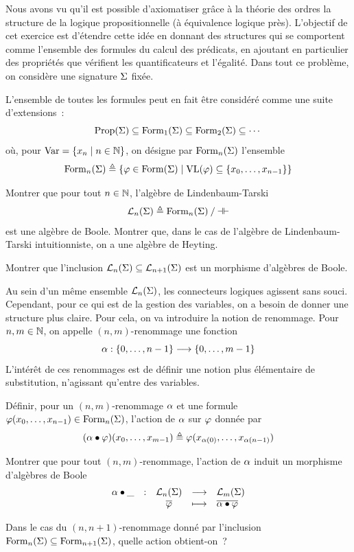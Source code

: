 \begin{problem}\label{pb.quasi.tripos}
  Nous avons vu qu'il est possible d'axiomatiser grâce à la théorie des ordres
  la structure de la logique propositionnelle (à équivalence logique près).
  L'objectif de cet exercice est d'étendre cette idée en donnant des structures
  qui se comportent comme l'ensemble des formules du calcul des prédicats, en
  ajoutant en particulier des propriétés que vérifient les quantificateurs et
  l'égalité. Dans tout ce problème, on considère une signature $\Sigma$ fixée.


  L'ensemble de toutes les formules peut en fait être considéré comme une
  suite d'extensions~:
  \[\operatorname{Prop}(\Sigma) \subseteq \operatorname{Form}_1(\Sigma)\subseteq\operatorname{Form}_2(\Sigma)\subseteq
  \cdots\]
  où, pour $\operatorname{Var} = \left\{ x_n \;\middle\vert\; n \in \mathbb N \right\}$, on désigne par $\operatorname{Form}_n(\Sigma)$
  l'ensemble
  \[\operatorname{Form}_n(\Sigma) \triangleq
  \left\{ \varphi\in\operatorname{Form}(\Sigma) \;\middle\vert\; \operatorname{VL}(\varphi)\subseteq\{x_0,\ldots,x_{n-1}\} \right\}\]
  \begin{pbQuest}
  \item Montrer que pour tout $n \in \mathbb N$, l'algèbre de Lindenbaum-Tarski
    \[\mathcal{L}_n(\Sigma)\triangleq \mathord{\operatorname{Form}_n(\Sigma)}\mathbin{/}\mathord{\mathrel{\mathord{\dashv}\mathord{\vdash}}}\]
    est une algèbre de Boole. Montrer que, dans le cas de l'algèbre de
    Lindenbaum-Tarski intuitionniste, on a une algèbre de Heyting.
  \item Montrer que l'inclusion $\mathcal{L}_n(\Sigma)\subseteq\mathcal{L}_{n+1}(\Sigma)$
    est un morphisme d'algèbres de Boole.
  \end{pbQuest}

  Au sein d'un même ensemble $\mathcal{L}_n(\Sigma)$, les connecteurs logiques
  agissent sans souci. Cependant, pour ce qui est de la gestion des variables,
  on a besoin de donner une structure plus claire. Pour cela, on va introduire
  la notion de renommage. Pour $n,m \in \mathbb N$, on appelle $(n,m)$-renommage
  une fonction
  \[\alpha : \displaystyle \{0,\ldots,n - 1\} \longrightarrow \{0,\ldots,m - 1\}\]
  L'intérêt de ces renommages est de définir une notion plus
  élémentaire de substitution, n'agissant qu'entre des variables.
  \begin{pbQuest}[resume]
  \item Définir, pour un $(n,m)$-renommage $\alpha$ et une formule
    $\varphi(x_0,\ldots,x_{n-1})\in\operatorname{Form}_n(\Sigma)$, l'action de $\alpha$
    sur $\varphi$ donnée par
    \[(\alpha\mathbin{\bullet}\varphi)(x_0,\ldots,x_{m-1}) \triangleq
    \varphi(x_{\alpha(0)},\ldots,x_{\alpha(n-1)})\]
  \item Montrer que pour tout $(n,m)$-renommage, l'action de $\alpha$ induit
    un morphisme d'algèbres de Boole
    \[\makeFun{\varRen\actRen\tok}{\LinTar_n(\Sign)}{\LinTar_m(\Sign)}
              {\clas{\varFF}}{\clas{\varRen\actRen\varFF}}\]
  \item Dans le cas du $(n,n+1)$-renommage donné par l'inclusion
    $\operatorname{Form}_n(\Sigma)\subseteq\operatorname{Form}_{n+1}(\Sigma)$, quelle action
    obtient-on~?
  \end{pbQuest}


\end{problem}
